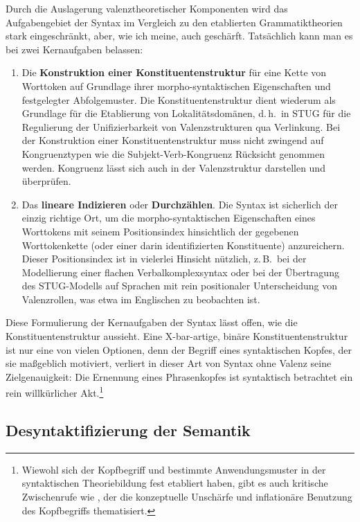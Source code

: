 {Durch die Auslagerung valenztheoretischer Komponenten wird das Aufgabengebiet der Syntax im Vergleich zu den etablierten Grammatiktheorien stark eingeschränkt, aber, wie ich meine, auch geschärft. Tatsächlich kann man es bei zwei Kernaufgaben belassen: 

\begin{enumerate}
  \item Die {\bf Konstruktion einer Konstituentenstruktur} für eine Kette von Worttoken auf Grundlage ihrer morpho-syntaktischen Eigenschaften und festgelegter Abfolgemuster. Die Konstituentenstruktur dient wiederum als Grundlage für die Etablierung von Lokalitätsdomänen, d.\,h.\ in STUG für die Regulierung der Unifizierbarkeit von Valenzstrukturen qua Verlinkung. Bei der Konstruktion einer Konstituentenstruktur muss nicht zwingend auf  Kongruenztypen wie die Subjekt-Verb-Kongruenz Rücksicht genommen werden. Kongruenz lässt sich auch in der Valenzstruktur darstellen und überprüfen.   
  \item Das {\bf lineare Indizieren} oder {\bf Durchzählen}. Die Syntax ist sicherlich der einzig richtige Ort, um die morpho-syntaktischen Eigenschaften eines Worttokens mit seinem Positionsindex hinsichtlich der gegebenen Worttokenkette (oder einer darin identifizierten Konstituente) anzureichern. Dieser Positionsindex ist in vielerlei Hinsicht nützlich, z.\,B.\ bei der Modellierung einer flachen Verbalkomplexsyntax oder bei der Übertragung des STUG-Modells auf Sprachen mit rein positionaler Unterscheidung von Valenzrollen, was etwa im Englischen zu beobachten ist.  
\end{enumerate}  
Diese Formulierung der Kernaufgaben der Syntax lässt offen, wie die Konstituentenstruktur aussieht. Eine X-bar-artige, binäre Konstituentenstruktur ist nur eine von vielen Optionen, denn der Begriff eines syntaktischen Kopfes, der sie ma\ss geblich motiviert, verliert in dieser Art von Syntax ohne Valenz seine Zielgenauigkeit: Die Ernennung eines Phrasenkopfes ist syntaktisch betrachtet ein rein willkürlicher Akt.\footnote{Wiewohl sich der Kopfbegriff und bestimmte Anwendungsmuster in der syntaktischen Theoriebildung fest etabliert haben, gibt es auch kritische Zwischenrufe wie \cite{Matthews:07}, der die konzeptuelle Unschärfe und inflationäre Benutzung des Kopfbegriffs thematisiert.}
   

  



\subsection{Desyntaktifizierung der Semantik}

}
